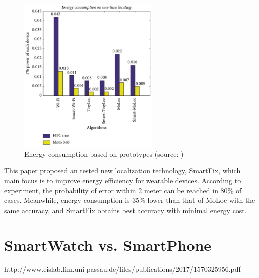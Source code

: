 \begin{figure}[H]
	\begin{centering}
		\includegraphics[width=0.6\textwidth]{img/smart_fix}
		\par\end{centering}
	\caption{Energy consumption based on prototypes (source: \cite{SmartFix})\label{fig:SmartFix}}
	\label{fig6}
\end{figure}

This paper proposed an tested new localization technology, SmartFix, which main focus is to improve energy efficiency for wearable devices. According to experiment, the probability of error within 2 meter can be reached in 80\% of cases. Meanwhile, energy consumption is 35\% lower than that of MoLoc with the same accuracy, and SmartFix obtains best accuracy with minimal energy cost.

\section{SmartWatch vs. SmartPhone}\label{sec:SWvsSP}

http://www.eislab.fim.uni-passau.de/files/publications/2017/1570325956.pdf
